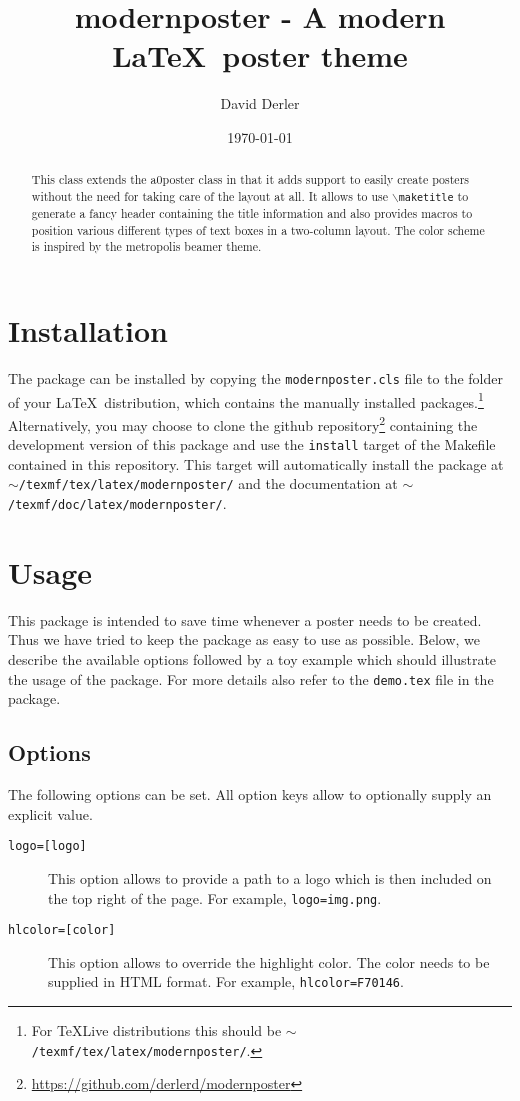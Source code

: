 \documentclass{article}
\title{modernposter - A modern \LaTeX~poster theme}
\author{David Derler}
\date{\today}
\begin{document}
  \maketitle

  \begin{abstract}
\noindent This class extends the a0poster class in that it adds support to easily create posters without the need for taking care of the layout at all. It allows to use {\tt $\backslash$maketitle} to generate a fancy header containing the title information and also provides macros to position various different types of text boxes in a two-column layout. The color scheme  is inspired by the metropolis beamer theme.
  \end{abstract}
  \section{Installation}
  The package can be installed by copying the {\tt modernposter.cls} file to the folder of your \LaTeX~distribution, which contains the manually installed packages.\footnote{For TeXLive distributions this should be {\tt $\sim$/texmf/tex/latex/modernposter/}.} Alternatively, you may choose to clone the github repository\footnote{\url{https://github.com/derlerd/modernposter}} containing the development version of this package and use the {\tt install} target of the Makefile contained in this repository. This target will automatically install the package at {\tt $\sim$/texmf/tex/latex/modern\-poster/} and the documentation at {\tt $\sim$/texmf/doc/latex/modernposter/}.
  \section{Usage}
  This package is intended to save time whenever a poster needs to be created. Thus we have tried to keep the package as easy to use as possible. Below, we describe the available options followed by a toy example which should illustrate the usage of the package. For more details also refer to the {\tt demo.tex} file in the package.
  \subsection{Options}
  The following options can be set. All option keys allow to optionally supply an explicit value.  
  \begin{description}
  	\item[{\tt logo=[logo]}] This option allows to provide a path to a logo which is then included on the top right of the page. For example, {\tt logo=img.png}.
  	\item[{\tt hlcolor=[color]}] This option allows to override the highlight color. The color needs to be supplied in HTML format. For example, {\tt hlcolor=F70146}. 
  \end{description}
\end{document}
